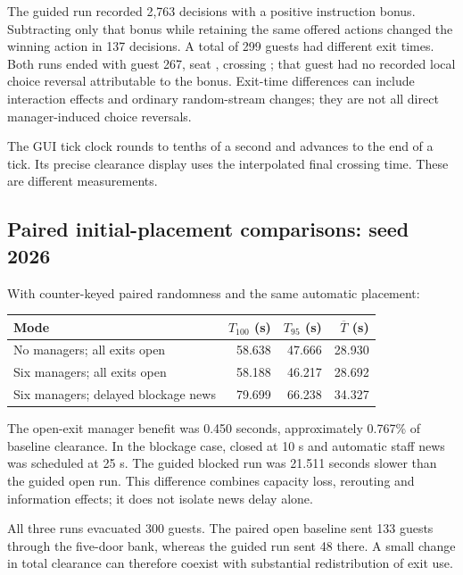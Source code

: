 \documentclass[11pt]{article}
\newcommand{\code}[1]{\texttt{\detokenize{#1}}}
\begin{document}
The guided run recorded 2,763 decisions with a positive instruction bonus.
Subtracting only that bonus while retaining the same offered actions changed
the winning action in 137 decisions. A total of 299 guests had different exit
times. Both runs ended with guest 267, seat \code{B-07-2-5}, crossing
\code{M4}; that guest had no recorded local choice reversal attributable to
the bonus. Exit-time differences can include interaction effects and ordinary
random-stream changes; they are not all direct manager-induced choice reversals.

The GUI tick clock rounds to tenths of a second and advances to the end of a
tick. Its precise clearance display uses the interpolated final crossing time.
These are different measurements.

\subsection{Paired initial-placement comparisons: seed 2026}
With counter-keyed paired randomness and the same automatic placement:
\begin{center}
\begin{tabular}{lrrr}
\toprule
Mode & $T_{100}$ (s) & $T_{95}$ (s) & $\overline T$ (s)\\
\midrule
No managers; all exits open & 58.638 & 47.666 & 28.930\\
Six managers; all exits open & 58.188 & 46.217 & 28.692\\
Six managers; delayed blockage news & 79.699 & 66.238 & 34.327\\
\bottomrule
\end{tabular}
\end{center}
The open-exit manager benefit was 0.450 seconds, approximately 0.767\% of
baseline clearance. In the blockage case, \code{SIDE_E1} closed at 10 s and
automatic staff news was scheduled at 25 s. The guided blocked run was 21.511
seconds slower than the guided open run. This difference combines capacity
loss, rerouting and information effects; it does not isolate news delay alone.

All three runs evacuated 300 guests. The paired open baseline sent 133 guests
through the five-door \code{MAIN} bank, whereas the guided run sent 48 there.
A small change in total clearance can therefore coexist with substantial
redistribution of exit use.
\end{document}
